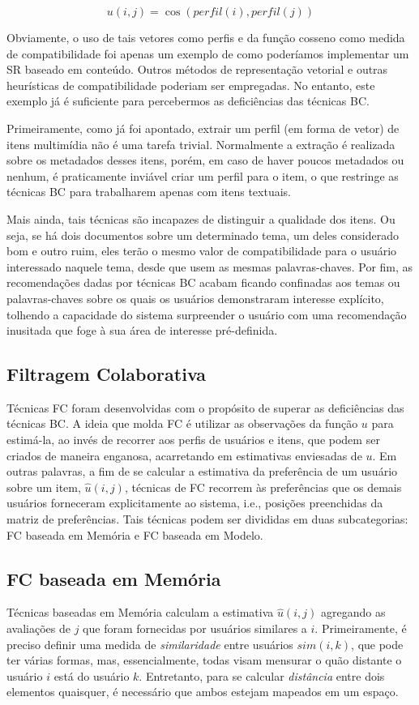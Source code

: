 \begin{equation}
u(i,j) = \cos (perfil(i),perfil(j))
\end{equation}

Obviamente, o uso de tais vetores como perfis e da função cosseno como medida de compatibilidade foi apenas um exemplo de como poderíamos implementar um SR baseado em conteúdo. Outros métodos de representação vetorial e outras heurísticas de compatibilidade poderiam ser empregadas. No entanto, este exemplo já é suficiente para percebermos as deficiências das técnicas BC. 

Primeiramente, como já foi apontado, extrair um perfil (em forma de vetor) de itens multimídia não é uma tarefa trivial. Normalmente a extração é realizada sobre os metadados desses itens, porém, em caso de haver poucos metadados ou nenhum, é praticamente inviável criar um perfil para o item, o que restringe as técnicas BC para trabalharem apenas com itens textuais. 

Mais ainda, tais técnicas são incapazes de distinguir a qualidade dos itens. Ou seja, se há dois documentos sobre um determinado tema, um deles considerado bom e outro ruim, eles terão o mesmo valor de compatibilidade para o usuário interessado naquele tema, desde que usem as mesmas palavras-chaves. Por fim, as recomendações dadas por técnicas BC acabam ficando confinadas aos temas ou palavras-chaves sobre os quais os usuários demonstraram interesse explícito, tolhendo a capacidade do sistema surpreender o usuário com uma recomendação inusitada que foge à sua área de interesse pré-definida.

\subsection{Filtragem Colaborativa}
Técnicas FC foram desenvolvidas com o propósito de superar as deficiências das técnicas BC. A ideia que molda FC é utilizar as observações da função $u$ para estimá-la, ao invés de recorrer aos perfis de usuários e itens, que podem ser criados de maneira enganosa, acarretando em estimativas enviesadas de $u$. Em outras palavras, a fim de se calcular a estimativa da preferência de um usuário sobre um item, $\hat{u}(i,j)$, técnicas de FC recorrem às preferências que os demais usuários forneceram explicitamente ao sistema, i.e., posições preenchidas da matriz de preferências. Tais técnicas podem ser divididas em duas subcategorias: FC baseada em Memória e FC baseada em Modelo.

\subsection{FC baseada em Memória}
Técnicas baseadas em Memória calculam a estimativa $\hat{u}(i,j)$ agregando as avaliações de $j$ que foram fornecidas por usuários similares a $i$. Primeiramente, é preciso definir uma medida de \textit{similaridade} entre usuários $sim(i,k)$, que pode ter várias formas, mas, essencialmente, todas visam mensurar o quão distante o usuário $i$ está do usuário $k$. Entretanto, para se calcular \textit{distância} entre dois elementos quaisquer, é necessário que ambos estejam mapeados em um espaço.

